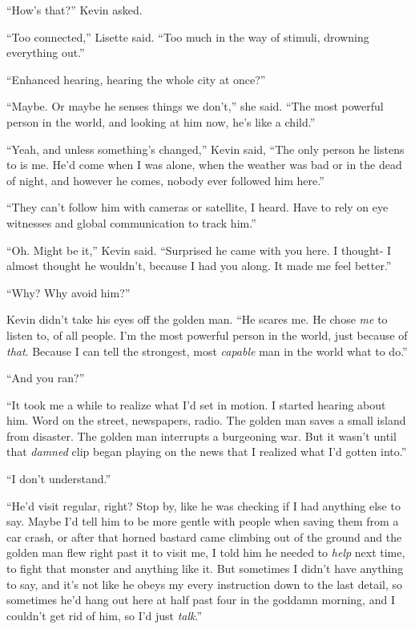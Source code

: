 ``How's that?''  Kevin asked.



``Too connected,'' Lisette said.  ``Too much in the way of stimuli, drowning everything out.''



``Enhanced hearing, hearing the whole city at once?''



``Maybe.  Or maybe he senses things we don't,'' she said.  ``The most powerful person in the world, and looking at him now, he's like a child.''



``Yeah, and unless something's changed,'' Kevin said, ``The only person he listens to is me.  He'd come when I was alone, when the weather was bad or in the dead of night, and however he comes, nobody ever followed him here.''



``They can't follow him with cameras or satellite, I heard.  Have to rely on eye witnesses and global communication to track him.''



``Oh.  Might be it,'' Kevin said.  ``Surprised he came with you here.  I thought- I almost thought he wouldn't, because I had you along.  It made me feel better.''



``Why?  Why avoid him?''



Kevin didn't take his eyes off the golden man.  ``He scares me.  He chose \emph{me} to listen to, of all people.  I'm the most powerful person in the world, just because of \emph{that}.  Because I can tell the strongest, most \emph{capable} man in the world what to do.''



``And you ran?''



``It took me a while to realize what I'd set in motion.  I started hearing about him.  Word on the street, newspapers, radio.  The golden man saves a small island from disaster.  The golden man interrupts a burgeoning war.  But it wasn't until that \emph{damned }clip began playing on the news that I realized what I'd gotten into.''



``I don't understand.''



``He'd visit regular, right?  Stop by, like he was checking if I had anything else to say.  Maybe I'd tell him to be more gentle with people when saving them from a car crash, or after that horned bastard came climbing out of the ground and the golden man flew right past it to visit me, I told him he needed to \emph{help} next time, to fight that monster and anything like it.  But sometimes I didn't have anything to say, and it's not like he obeys my every instruction down to the last detail, so sometimes he'd hang out here at half past four in the goddamn morning, and I couldn't get rid of him, so I'd just \emph{talk}.''



